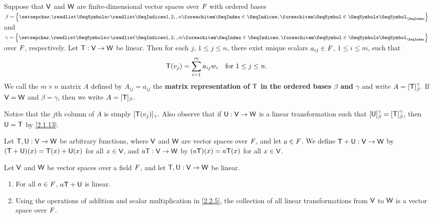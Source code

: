 \begin{defn}\label{2.2.4}
  Suppose that \(\mathsf{V}\) and \(\mathsf{W}\) are finite-dimensional vector spaces over \(\mathit{F}\) with ordered bases \(\beta = \set{\seq{v}{1,2,,n}}\) and \(\gamma = \set{\seq{w}{1,2,,m}}\) over \(\mathit{F}\), respectively.
  Let \(\mathsf{T} : \mathsf{V} \to \mathsf{W}\) be linear.
  Then for each \(j\), \(1 \leq j \leq n\), there exist unique scalars \(a_{i j} \in \mathit{F}\), \(1 \leq i \leq m\), such that
  \[
    \mathsf{T}(v_j) = \sum_{i = 1}^m a_{i j} w_i \quad \text{for } 1 \leq j \leq n.
  \]
  We call the \(m \times n\) matrix \(A\) defined by \(A_{i j} = a_{i j}\) the \textbf{matrix representation of \(\mathsf{T}\) in the ordered bases \(\beta\) and \(\gamma\)} and write \(A = [\mathsf{T}]_{\beta}^{\gamma}\).
  If \(\mathsf{V} = \mathsf{W}\) and \(\beta = \gamma\), then we write \(A = [\mathsf{T}]_{\beta}\).
\end{defn}

\begin{note}
  Notice that the \(j\)th column of \(A\) is simply \([\mathsf{T}(v_j)]_{\gamma}\).
  Also observe that if \(\mathsf{U} : \mathsf{V} \to \mathsf{W}\) is a linear transformation such that \([\mathsf{U}]_{\beta}^{\gamma} = [\mathsf{T}]_{\beta}^{\gamma}\), then \(\mathsf{U} = \mathsf{T}\) by \cref{2.1.13}.
\end{note}

\begin{defn}\label{2.2.5}
  Let \(\mathsf{T}, \mathsf{U} : \mathsf{V} \to \mathsf{W}\) be arbitrary functions, where \(\mathsf{V}\) and \(\mathsf{W}\) are vector spaces over \(\mathit{F}\), and let \(a \in \mathit{F}\).
  We define \(\mathsf{T} + \mathsf{U} : \mathsf{V} \to \mathsf{W}\) by \((\mathsf{T} + \mathsf{U})(x) = \mathsf{T}(x) + \mathsf{U}(x)\) for all \(x \in \mathsf{V}\), and \(a \mathsf{T}: \mathsf{V} \to \mathsf{W}\) by \((a \mathsf{T})(x) = a \mathsf{T}(x)\) for all \(x \in \mathsf{V}\).
\end{defn}

\begin{thm}\label{2.7}
  Let \(\mathsf{V}\) and \(\mathsf{W}\) be vector spaces over a field \(\mathit{F}\), and let \(\mathsf{T}, \mathsf{U} : \mathsf{V} \to \mathsf{W}\) be linear.
  \begin{enumerate}
    \item For all \(a \in \mathit{F}\), \(a \mathsf{T} + \mathsf{U}\) is linear.
    \item Using the operations of addition and scalar multiplication in \cref{2.2.5}, the collection of all linear transformations from \(\mathsf{V}\) to \(\mathsf{W}\) is a vector space over \(\mathit{F}\).
  \end{enumerate}
\end{thm}

